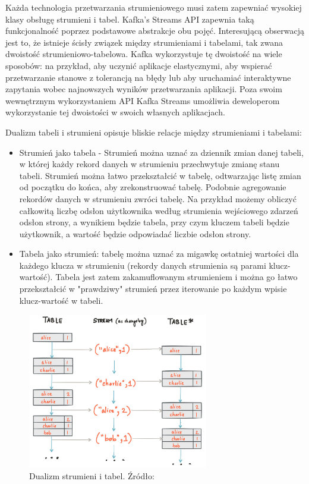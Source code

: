 Każda technologia przetwarzania strumieniowego musi zatem zapewniać wysokiej klasy obsługę strumieni i tabel. Kafka's Streams API zapewnia taką funkcjonalność poprzez podstawowe abstrakcje obu pojęć. Interesującą obserwacją jest to, że istnieje ścisły związek między strumieniami i tabelami, tak zwana dwoistość strumieniowo-tabelowa. Kafka wykorzystuje tę dwoistość na wiele sposobów: na przykład, aby uczynić aplikacje elastycznymi, aby wspierać przetwarzanie stanowe z tolerancją na błędy lub aby uruchamiać interaktywne zapytania wobec najnowszych wyników przetwarzania aplikacji. Poza swoim wewnętrznym wykorzystaniem API Kafka Streams umożliwia deweloperom wykorzystanie tej dwoistości w swoich własnych aplikacjach. \cite{StreamsConcept}

Dualizm tabeli i strumieni opisuje bliskie relacje między strumieniami i tabelami: \cite{StreamsConcept}
\begin{itemize}
    \item Strumień jako tabela - Strumień można uznać za dziennik zmian danej tabeli, w której każdy rekord danych w strumieniu przechwytuje zmianę stanu tabeli. Strumień można łatwo przekształcić w tabelę, odtwarzając listę zmian od początku do końca, aby zrekonstruować tabelę. Podobnie agregowanie rekordów danych w strumieniu zwróci tabelę. Na przykład możemy obliczyć całkowitą liczbę odsłon użytkownika według strumienia wejściowego zdarzeń odsłon strony, a wynikiem będzie tabela, przy czym kluczem tabeli będzie użytkownik, a wartość będzie odpowiadać liczbie odsłon strony.
    \item Tabela jako strumień: tabelę można uznać za migawkę ostatniej wartości dla każdego klucza w strumieniu (rekordy danych strumienia są parami klucz-wartość). Tabela jest zatem zakamuflowanym strumieniem i można go łatwo przekształcić w "prawdziwy" strumień przez iterowanie po każdym wpisie klucz-wartość w tabeli. 
\end{itemize}

\begin{figure}[h!]
  \centering
    \includegraphics[width=0.7\textwidth]{images/StreamsTableDuality.jpg}
  \caption{Dualizm strumieni i tabel. Źródło: \cite{StreamsConcept} }
\end{figure}
\FloatBarrier

